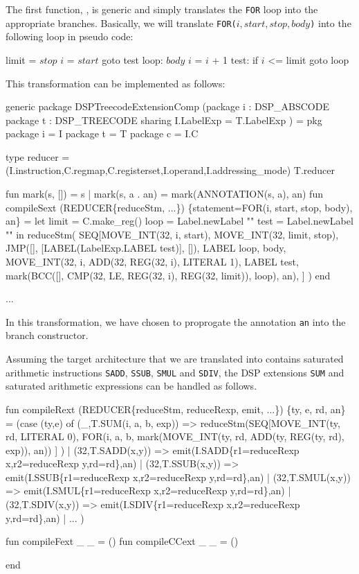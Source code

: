 The first function, , is generic and simply
translates the \verb|FOR| loop into the appropriate branches.
Basically, we will translate \verb|FOR(|$i,start,stop,body$\verb|)| into
the following loop in pseudo code:
\begin{SML}
        limit = \(stop\)
        \(i\)  = \(start\)
        goto test
  loop: \(body\)
        \(i\) = \(i\) + 1
  test: if \(i\) <= limit goto loop
\end{SML}
This transformation can be implemented as follows:
\begin{SML}
 generic package DSPTreecodeExtensionComp
    (package i : DSP_ABSCODE
     package t : DSP_TREECODE
       sharing I.LabelExp = T.LabelExp
    ) =
 pkg
   package i = I
   package t = T
   package c = I.C

   type reducer = 
     (I.instruction,C.regmap,C.registerset,I.operand,I.addressing_mode) T.reducer
   
   fun mark(s, []) = s
     | mark(s, a . an) = mark(ANNOTATION(s, a), an)
   fun compileSext (REDUCER\{reduceStm, ...\}) 
      \{statement=FOR(i, start, stop, body), an\} =
   let limit = C.make_reg()
       loop  = Label.newLabel ""
       test  = Label.newLabel ""
   in  reduceStm(
         SEQ[MOVE_INT(32, i, start),
             MOVE_INT(32, limit, stop),
             JMP([], [LABEL(LabelExp.LABEL test)], []),
             LABEL loop,
             body,
             MOVE_INT(32, i, ADD(32, REG(32, i), LITERAL 1),
             LABEL test,
             mark(BCC([], 
                    CMP(32, LE, REG(32, i), REG(32, limit)), 
                      loop),
                  an),
            ]
      )
   end

   ...
\end{SML}
In this transformation, we have chosen to proprogate the annotation
\verb|an| into the branch constructor.

Assuming the target architecture that we are translated into contains
saturated arithmetic instructions \verb|SADD|, \verb|SSUB|, \verb|SMUL|
and \verb|SDIV|, the DSP extensions
\verb|SUM| and saturated arithmetic expressions can be handled as follows.
\begin{SML}
   fun compileRext (REDUCER\{reduceStm, reduceRexp, emit, ...\}) 
       \{ty, e, rd, an\} =
   (case (ty,e) of
      (_,T.SUM(i, a, b, exp)) =>
        reduceStm(SEQ[MOVE_INT(ty, rd, LITERAL 0),
                      FOR(i, a, b, 
                         mark(MOVE_INT(ty, rd, ADD(ty, REG(ty, rd), exp)), an))
                     ]
                 )
   | (32,T.SADD(x,y)) => emit(I.SADD\{r1=reduceRexp x,r2=reduceRexp y,rd=rd\},an)
   | (32,T.SSUB(x,y)) => emit(I.SSUB\{r1=reduceRexp x,r2=reduceRexp y,rd=rd\},an)
   | (32,T.SMUL(x,y)) => emit(I.SMUL\{r1=reduceRexp x,r2=reduceRexp y,rd=rd\},an)
   | (32,T.SDIV(x,y)) => emit(I.SDIV\{r1=reduceRexp x,r2=reduceRexp y,rd=rd\},an)
   | ...
   )

   fun compileFext _ _ = ()
   fun compileCCext _ _ = ()

  end
\end{SML}

